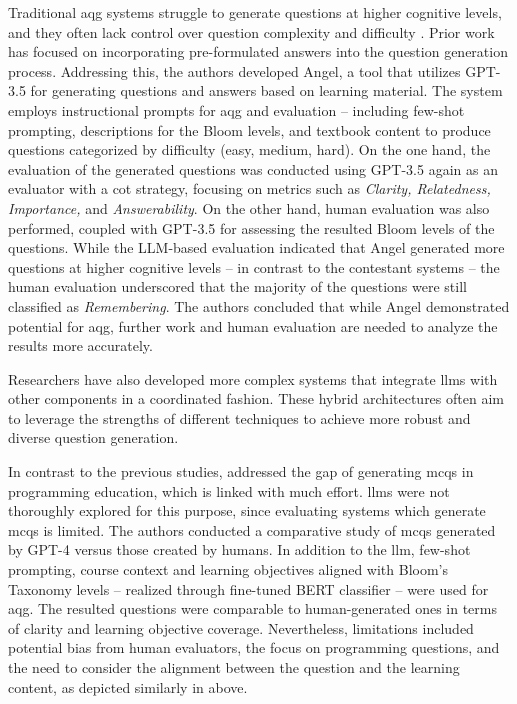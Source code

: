 Traditional \ac{aqg} systems struggle to generate questions at higher cognitive levels, and they often lack control over question complexity and difficulty \cite{blobstein_angel_2023}. Prior work has focused on incorporating pre-formulated answers into the question generation process. Addressing this, the authors developed Angel, a tool that utilizes GPT-3.5 for generating questions and answers based on learning material. The system employs instructional prompts for \ac{aqg} and evaluation -- including few-shot prompting, descriptions for the Bloom levels, and textbook content to produce questions categorized by difficulty (easy, medium, hard). On the one hand, the evaluation of the generated questions was conducted using GPT-3.5 again as an evaluator with a \ac{cot} strategy, focusing on metrics such as \textit{Clarity, Relatedness, Importance,} and \textit{Answerability}. On the other hand, human evaluation was also performed, coupled with GPT-3.5 for assessing the resulted Bloom levels of the questions. While the LLM-based evaluation indicated that Angel generated more questions at higher cognitive levels -- in contrast to the contestant systems -- the human evaluation underscored that the majority of the questions were still classified as \textit{Remembering}. The authors concluded that while Angel demonstrated potential for \ac{aqg}, further work and human evaluation are needed to analyze the results more accurately.

 Researchers have also developed more complex systems that integrate \ac{llms} with other components in a coordinated fashion. These hybrid architectures often aim to leverage the strengths of different techniques to achieve more robust and diverse question generation.

In contrast to the previous studies, \cite{doughty_comparative_2024} addressed the gap of generating \ac{mcqs} in programming education, which is linked with much effort. \ac{llms} were not thoroughly explored for this purpose, since evaluating systems which generate \ac{mcqs} is limited. The authors conducted a comparative study of \ac{mcqs} generated by GPT-4 versus those created by humans. In addition to the \ac{llm}, few-shot prompting, course context and learning objectives aligned with Bloom's Taxonomy levels -- realized through fine-tuned BERT classifier -- were used for \ac{aqg}. The resulted questions were comparable to human-generated ones in terms of clarity and learning objective coverage. Nevertheless, limitations included potential bias from human evaluators, the focus on programming questions, and the need to consider the alignment between the question and the learning content, as depicted similarly in \cite{al_faraby_analysis_2024} above.

